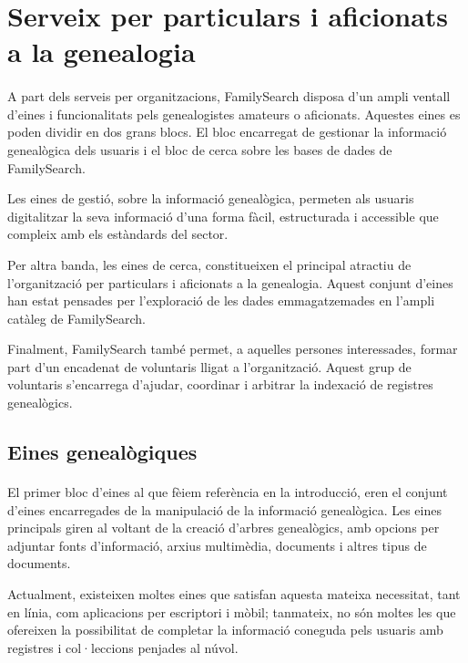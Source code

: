 \section{Serveix per particulars i aficionats a la genealogia}

    \paragraph{}
    A part dels serveis per organitzacions, FamilySearch disposa d'un ampli ventall d'eines i funcionalitats pels genealogistes amateurs o aficionats. Aquestes eines es poden dividir en dos grans blocs. El bloc encarregat de gestionar la informació genealògica dels usuaris i el bloc de cerca sobre les bases de dades de FamilySearch.

    Les eines de gestió, sobre la informació genealògica, permeten als usuaris digitalitzar la seva informació d'una forma fàcil, estructurada i accessible que compleix amb els estàndards del sector.

    Per altra banda, les eines de cerca, constitueixen el principal atractiu de l’organització per particulars i aficionats a la genealogia. Aquest conjunt d'eines han estat pensades per l’exploració de les dades emmagatzemades en l'ampli catàleg de FamilySearch.

    Finalment, FamilySearch també permet, a aquelles persones interessades, formar part d'un encadenat de voluntaris lligat a l'organització. Aquest grup de voluntaris s'encarrega d'ajudar, coordinar i arbitrar la indexació de registres genealògics.


    \subsection{Eines genealògiques}

    \paragraph{}
    El primer bloc d'eines al que fèiem referència en la introducció, eren el conjunt d'eines encarregades de la manipulació de la informació genealògica. Les eines principals giren al voltant de la creació d’arbres genealògics, amb opcions per adjuntar fonts d’informació, arxius multimèdia, documents i altres tipus de documents.

    Actualment, existeixen moltes eines que satisfan aquesta mateixa necessitat, tant en línia, com aplicacions per escriptori i mòbil; tanmateix, no són moltes les que ofereixen la possibilitat de completar la informació coneguda pels usuaris amb registres i col·leccions penjades al núvol.

